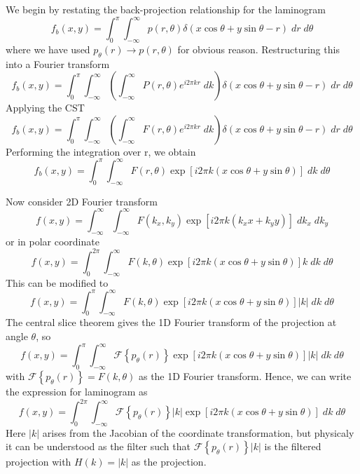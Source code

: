 \documentclass[../../../main.tex]{subfiles}
\begin{document}
We begin by restating the back-projection relationship for the laminogram
\begin{equation*}
    f_b(x,y)=\int_{0 }^{\pi}\int_{-\infty}^{\infty} p(r,\theta)\delta(x\cos\theta+y\sin\theta -r)\;dr\;d\theta
\end{equation*}
where we have used $p_\theta(r)\rightarrow p(r,\theta)$ for obvious reason.
Restructuring this into a Fourier transform
\begin{equation*}
    f_b(x,y)=\int_{0 }^{\pi}\int_{-\infty}^{\infty} \left(\int_{-\infty}^{\infty} P(r,\theta)e^{i2\pi kr}\;dk\right)\delta(x\cos\theta+y\sin\theta -r)\;dr\;d\theta
\end{equation*}
Applying the CST
\begin{equation*}
    f_b(x,y)=\int_{0 }^{\pi}\int_{-\infty}^{\infty} \left(\int_{-\infty}^{\infty} F(r,\theta)e^{i2\pi kr}\;dk\right)\delta(x\cos\theta+y\sin\theta -r)\;dr\;d\theta
\end{equation*}
Performing the integration over r, we obtain
\begin{equation*}
    f_b(x,y)=\int_{0 }^{\pi}\int_{-\infty}^{\infty} F(r,\theta)\exp \left[ i2 \pi k \left( x \cos \theta+ y \sin \theta \right)  \right] \;dk\;d\theta
\end{equation*}

Now consider 2D Fourier transform
\begin{equation*}
    f(x,y) = \int_{-\infty }^{\infty}\int_{-\infty }^{\infty}F(k_x,k_y)\exp \left[{i 2\pi k (k_x x + k_y y)}\right]\; dk_x \; dk_y
\end{equation*}
or in polar coordinate
\begin{equation*}
    f(x,y) = \int_{0 }^{2\pi}\int_{-\infty }^{\infty}F(k,\theta) \exp \left[{i 2\pi k (x\cos\theta + y\sin\theta)}\right] k \; dk \; d\theta
\end{equation*}
This can be modified to
\begin{equation*}
    f(x,y) = \int_{0 }^{\pi}\int_{-\infty }^{\infty}F(k,\theta) \exp \left[{i 2\pi k (x\cos\theta + y\sin\theta)}\right] |k| \; dk \; d\theta
\end{equation*}
The central slice theorem gives the 1D Fourier transform of the projection at angle $\theta$, so
\begin{equation*}
    f(x,y) = \int_{0 }^{\pi}\int_{-\infty }^{\infty}\mathcal{F} \left\{ p_\theta(r) \right\}  \exp \left[{i 2\pi k (x\cos\theta + y\sin\theta)}\right] |k| \; dk \; d\theta
\end{equation*}
with $\mathcal{F} \left\{ p_\theta(r) \right\}=F(k,\theta)$ as the 1D Fourier transform.
Hence, we can write the expression for laminogram as
\begin{equation*}
    f(x,y) = \int_{0}^{2\pi}\int_{-\infty }^{\infty}\mathcal{F} \left\{ p_\theta(r) \right\} |k| \exp \left[{i 2\pi k (x\cos\theta + y\sin\theta)}\right] \; dk \; d\theta
\end{equation*}
Here $|k|$ arises from the Jacobian of the coordinate transformation, but physicaly it can be understood as the filter such that $\mathcal{F} \left\{ p_\theta(r) \right\} |k|$ is the filtered projection with $H(k)=|k|$ as the projection.
\end{document}

